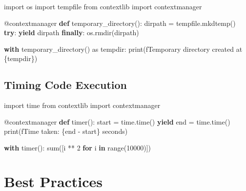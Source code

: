 \documentclass[
  letterpaper,
  DIV=11,
  numbers=noendperiod]{scrreprt}
\newenvironment{Shaded}{\begin{snugshade}}{\end{snugshade}}
\newcommand{\AttributeTok}[1]{\textcolor[rgb]{0.40,0.45,0.13}{#1}}
\newcommand{\BuiltInTok}[1]{\textcolor[rgb]{0.00,0.23,0.31}{#1}}
\newcommand{\ControlFlowTok}[1]{\textcolor[rgb]{0.00,0.23,0.31}{\textbf{#1}}}
\newcommand{\DecValTok}[1]{\textcolor[rgb]{0.68,0.00,0.00}{#1}}
\newcommand{\ImportTok}[1]{\textcolor[rgb]{0.00,0.46,0.62}{#1}}
\newcommand{\KeywordTok}[1]{\textcolor[rgb]{0.00,0.23,0.31}{\textbf{#1}}}
\newcommand{\NormalTok}[1]{\textcolor[rgb]{0.00,0.23,0.31}{#1}}
\newcommand{\OperatorTok}[1]{\textcolor[rgb]{0.37,0.37,0.37}{#1}}
\newcommand{\SpecialCharTok}[1]{\textcolor[rgb]{0.37,0.37,0.37}{#1}}
\newcommand{\SpecialStringTok}[1]{\textcolor[rgb]{0.13,0.47,0.30}{#1}}
\begin{document}
\begin{Shaded}
\begin{Highlighting}[]
\ImportTok{import}\NormalTok{ os}
\ImportTok{import}\NormalTok{ tempfile}
\ImportTok{from}\NormalTok{ contextlib }\ImportTok{import}\NormalTok{ contextmanager}

\AttributeTok{@contextmanager}
\KeywordTok{def}\NormalTok{ temporary\_directory():}
\NormalTok{    dirpath }\OperatorTok{=}\NormalTok{ tempfile.mkdtemp()}
    \ControlFlowTok{try}\NormalTok{:}
        \ControlFlowTok{yield}\NormalTok{ dirpath}
    \ControlFlowTok{finally}\NormalTok{:}
\NormalTok{        os.rmdir(dirpath)}

\ControlFlowTok{with}\NormalTok{ temporary\_directory() }\ImportTok{as}\NormalTok{ tempdir:}
    \BuiltInTok{print}\NormalTok{(}\SpecialStringTok{f\textquotesingle{}Temporary directory created at }\SpecialCharTok{\{}\NormalTok{tempdir}\SpecialCharTok{\}}\SpecialStringTok{\textquotesingle{}}\NormalTok{)}
\end{Highlighting}
\end{Shaded}

\subsection{Timing Code Execution}\label{timing-code-execution}

\begin{Shaded}
\begin{Highlighting}[]
\ImportTok{import}\NormalTok{ time}
\ImportTok{from}\NormalTok{ contextlib }\ImportTok{import}\NormalTok{ contextmanager}

\AttributeTok{@contextmanager}
\KeywordTok{def}\NormalTok{ timer():}
\NormalTok{    start }\OperatorTok{=}\NormalTok{ time.time()}
    \ControlFlowTok{yield}
\NormalTok{    end }\OperatorTok{=}\NormalTok{ time.time()}
    \BuiltInTok{print}\NormalTok{(}\SpecialStringTok{f\textquotesingle{}Time taken: }\SpecialCharTok{\{}\NormalTok{end }\OperatorTok{{-}}\NormalTok{ start}\SpecialCharTok{\}}\SpecialStringTok{ seconds\textquotesingle{}}\NormalTok{)}

\ControlFlowTok{with}\NormalTok{ timer():}
    \BuiltInTok{sum}\NormalTok{([i }\OperatorTok{**} \DecValTok{2} \ControlFlowTok{for}\NormalTok{ i }\KeywordTok{in} \BuiltInTok{range}\NormalTok{(}\DecValTok{10000}\NormalTok{)])}
\end{Highlighting}
\end{Shaded}

\section{Best Practices}\label{best-practices-5}
\end{document}

